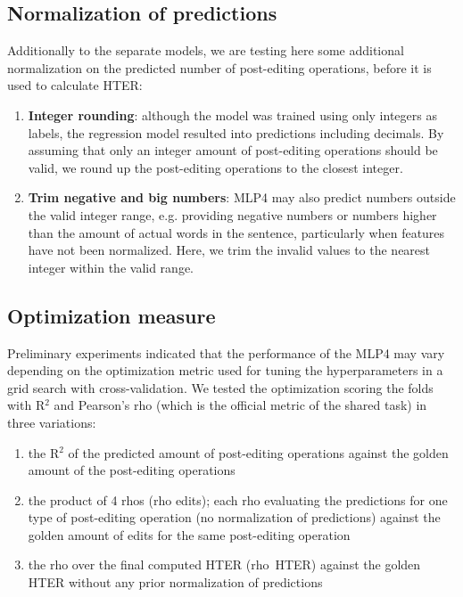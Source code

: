 \documentclass[11pt,letterpaper]{article}
\begin{document}
\subsection{Normalization of predictions}
\label{sec:methods:normalization}

Additionally to the separate models, we are testing here some additional
normalization on the predicted number of post-editing operations, before it is
used to calculate HTER:

\begin{enumerate}[label=\roman*.]
  \item {\bf Integer rounding}: although the model was trained using only
  integers as labels, the regression model resulted into predictions including
  decimals. By assuming that only an integer amount of post-editing operations
  should be valid, we round up the post-editing operations to the closest
  integer.
  \item {\bf Trim negative and big numbers}: MLP4 may also predict numbers
  outside the valid integer range, e.g. providing negative numbers or numbers
  higher than the amount of actual words in the sentence, particularly when
  features have not been normalized.
  Here, we trim the invalid values to the nearest integer within the valid
  range.
\end{enumerate}


\subsection{Optimization measure}
\label{sec:methods:optimization}

Preliminary experiments indicated that the performance of the MLP4
may vary depending on the optimization metric used for tuning the
hyperparameters in a grid search with cross-validation. We tested the
optimization scoring the folds with R$^2$ and Pearson's rho (which is the
official metric of the shared task) in three variations:
\begin{enumerate}[label=\alph*)]
  \item the R$^2$ of the predicted amount of post-editing operations against
  the golden amount of the post-editing operations 
  \item the product of 4 rhos (rho edits); each rho evaluating the predictions
  for one type of post-editing operation (no normalization of predictions) against the golden
  amount of edits for the same post-editing operation 
  \item the rho over the final computed HTER (rho~HTER) against the golden HTER
  without any prior normalization of predictions 
\end{enumerate}
\end{document}
